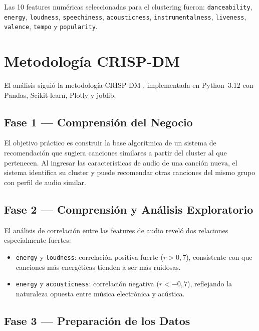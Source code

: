 \documentclass[12pt, a4paper]{article}
\begin{document}
Las 10 features numéricas seleccionadas para el clustering fueron:
\texttt{danceability}, \texttt{energy}, \texttt{loudness},
\texttt{speechiness}, \texttt{acousticness}, \texttt{instrumentalness},
\texttt{liveness}, \texttt{valence}, \texttt{tempo} y \texttt{popularity}.

\section{Metodología CRISP-DM}

El análisis siguió la metodología CRISP-DM \cite{wirth2000crisp},
implementada en Python~3.12 con Pandas, Scikit-learn, Plotly y joblib.

\subsection{Fase 1 — Comprensión del Negocio}

El objetivo práctico es construir la base algorítmica de un sistema de
recomendación que sugiera canciones similares a partir del cluster al que
pertenecen. Al ingresar las características de audio de una canción nueva,
el sistema identifica su cluster y puede recomendar otras canciones del
mismo grupo con perfil de audio similar.

\subsection{Fase 2 — Comprensión y Análisis Exploratorio}

El análisis de correlación entre las features de audio reveló dos relaciones
especialmente fuertes:

\begin{itemize}
  \item \texttt{energy} y \texttt{loudness}: correlación positiva fuerte
        ($r > 0{,}7$), consistente con que canciones más energéticas
        tienden a ser más ruidosas.
  \item \texttt{energy} y \texttt{acousticness}: correlación negativa
        ($r < -0{,}7$), reflejando la naturaleza opuesta entre música
        electrónica y acústica.
\end{itemize}

\subsection{Fase 3 — Preparación de los Datos}
\end{document}
